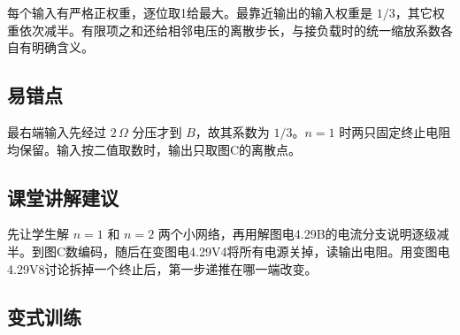 \documentclass[UTF8,fontset=fandol,a4paper,11pt]{ctexart}
\begin{document}
每个输入有严格正权重，逐位取1给最大。最靠近输出的输入权重是 $1/3$，其它权重依次减半。有限项之和还给相邻电压的离散步长，与接负载时的统一缩放系数各自有明确含义。



\subsection*{易错点}

最右端输入先经过 $2\,\Omega$ 分压才到 $B$，故其系数为 $1/3$。$n=1$ 时两只固定终止电阻均保留。输入按二值取数时，输出只取图C的离散点。



\subsection*{课堂讲解建议}

先让学生解 $n=1$ 和 $n=2$ 两个小网络，再用解图电4.29B的电流分支说明逐级减半。到图C数编码，随后在变图电4.29V4将所有电源关掉，读输出电阻。用变图电4.29V8讨论拆掉一个终止后，第一步递推在哪一端改变。


\subsection*{变式训练}
\end{document}
